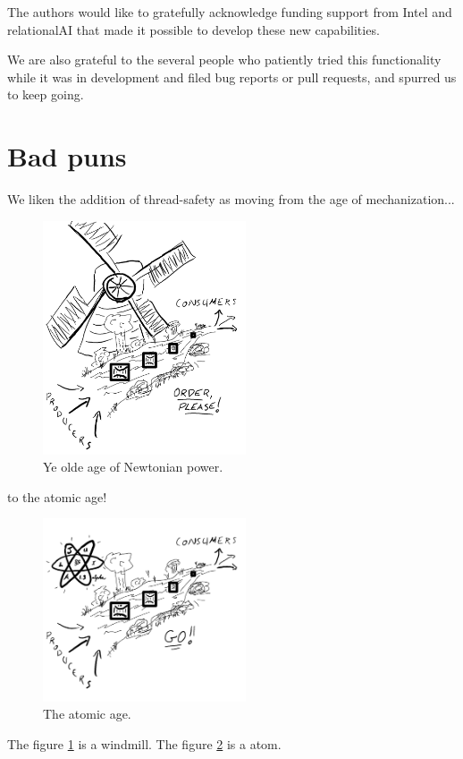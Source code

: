 \documentclass{juliacon}
\begin{document}
The authors would like to gratefully acknowledge funding support from Intel and relationalAI that made it possible to develop these new capabilities.

We are also grateful to the several people who patiently tried this functionality while it was in development and filed bug reports or pull requests, and spurred us to keep going.


\section{Bad puns}
\label{subsub:puns}

We liken the addition of thread-safety as moving from the age of mechanization...

\begin{figure}[h]
\centerline{\includegraphics[width=6cm]{images/threads_windmill.png}}
\caption{Ye olde age of Newtonian power.}
\label{fig:windmill}
\end{figure}

to the atomic age!

\begin{figure}[h]
\centerline{\includegraphics[width=6cm]{images/threads_atomic.png}}
\caption{The atomic age.}
\label{fig:atomic}
\end{figure}


The figure \ref{fig:windmill} is a windmill.
The figure \ref{fig:atomic} is a atom.


\end{document}
